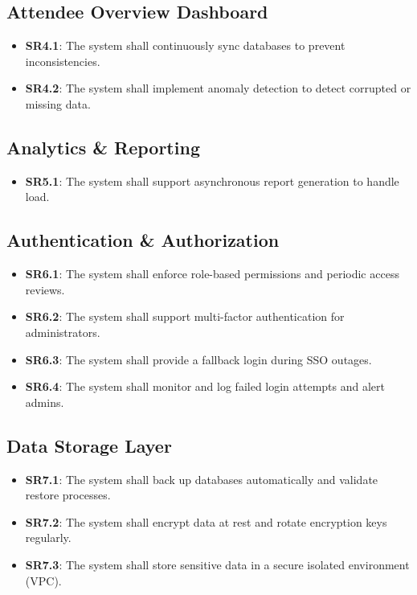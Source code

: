 \documentclass{article}
\begin{document}
\subsection{Attendee Overview Dashboard}
\begin{itemize}
    \item \textbf{SR4.1}: The system shall continuously sync databases to prevent inconsistencies.
    \item \textbf{SR4.2}: The system shall implement anomaly detection to detect corrupted or missing data.
\end{itemize}

\subsection{Analytics \& Reporting}
\begin{itemize}
    \item \textbf{SR5.1}: The system shall support asynchronous report generation to handle load.
\end{itemize}

\subsection{Authentication \& Authorization}
\begin{itemize}
    \item \textbf{SR6.1}: The system shall enforce role-based permissions and periodic access reviews.
    \item \textbf{SR6.2}: The system shall support multi-factor authentication for administrators.
    \item \textbf{SR6.3}: The system shall provide a fallback login during SSO outages.
    \item \textbf{SR6.4}: The system shall monitor and log failed login attempts and alert admins.
\end{itemize}

\subsection{Data Storage Layer}
\begin{itemize}
    \item \textbf{SR7.1}: The system shall back up databases automatically and validate restore processes.
    \item \textbf{SR7.2}: The system shall encrypt data at rest and rotate encryption keys regularly.
    \item \textbf{SR7.3}: The system shall store sensitive data in a secure isolated environment (VPC).
\end{itemize}
\end{document}
